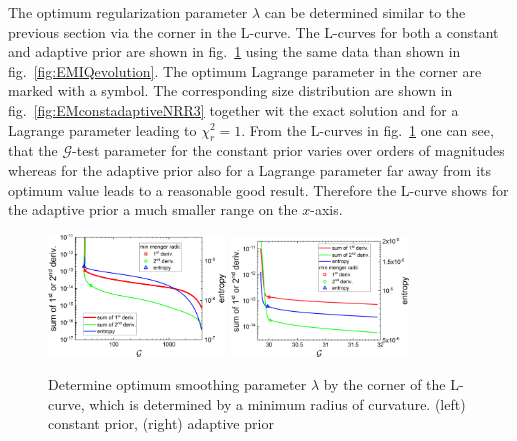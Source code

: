 The optimum regularization parameter $\lambda$ can be determined similar to the previous section via the corner in the L-curve. The L-curves for both a constant and adaptive prior are shown in fig.\ \ref{fig:EMlambdaLcurve} using the same data than shown in fig.\ \ref{fig:EMIQevolution}. The optimum Lagrange parameter in the corner are marked with a symbol. The corresponding size distribution are shown in fig.\ \ref{fig:EMconstadaptiveNRR3} together wit the exact solution and for a Lagrange parameter leading to $\chi_r^2=1$. From the L-curves in fig.\ \ref{fig:EMlambdaLcurve} one can see, that the $\mathcal{G}$-test parameter for the constant prior varies over orders of magnitudes whereas for the adaptive prior also for a Lagrange parameter far away from its optimum value leads to a reasonable good result. Therefore the L-curve shows for the adaptive prior a much smaller range on the $x$-axis.

\begin{figure}[htb]
\centering
\includegraphics[width=0.42\textwidth]{../images/form_factor/EM/EMconstLcurve.png} \hspace{0.06\textwidth}
\includegraphics[width=0.42\textwidth]{../images/form_factor/EM/EMadaptiveLcurve.png}
\caption{Determine optimum smoothing parameter $\lambda$ by the corner of the L-curve, which is determined by a minimum radius of curvature. (left) constant prior, (right) adaptive prior\label{fig:EMlambdaLcurve}}
\end{figure}

